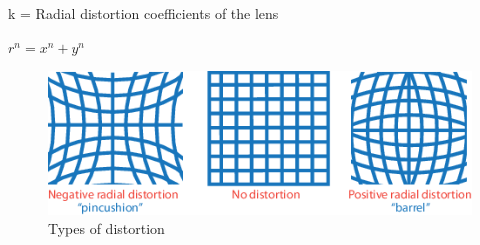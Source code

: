 k = Radial distortion coefficients of the lens

$r^n = x^n + y^n$

\begin{figure}[ht!]
	\centering
	\includegraphics[width=0.7\linewidth]{graphics/calibration_radial_distortion}
	\caption[]{Types of distortion}
 
	\label{fig:calibrationradialdistortion}
\end{figure}



